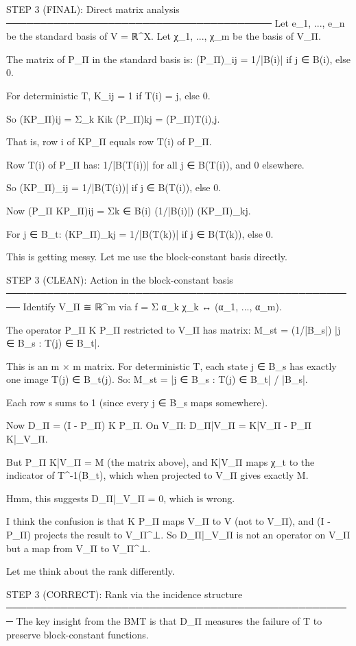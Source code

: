 STEP 3 (FINAL): Direct matrix analysis
───────────────────────────────────────
Let {e_1, ..., e_n} be the standard basis of V = ℝ^X.
Let {χ_1, ..., χ_m} be the basis of V_Π.

The matrix of P_Π in the standard basis is:
(P_Π)_{ij} = 1/|B(i)| if j ∈ B(i), else 0.

For deterministic T, K_{ij} = 1 if T(i) = j, else 0.

So (KP_Π){ij} = Σ_k K{ik} (P_Π){kj} = (P_Π){T(i),j}.

That is, row i of KP_Π equals row T(i) of P_Π.

Row T(i) of P_Π has: 1/|B(T(i))| for all j ∈ B(T(i)), and 0 elsewhere.

So (KP_Π)_{ij} = 1/|B(T(i))| if j ∈ B(T(i)), else 0.

Now (P_Π KP_Π){ij} = Σ{k ∈ B(i)} (1/|B(i)|) (KP_Π)_{kj}.

For j ∈ B_t:
(KP_Π)_{kj} = 1/|B(T(k))| if j ∈ B(T(k)), else 0.

This is getting messy. Let me use the block-constant basis directly.

STEP 3 (CLEAN): Action in the block-constant basis
────────────────────────────────────────────────────
Identify V_Π ≅ ℝ^m via f = Σ α_k χ_k ↔ (α_1, ..., α_m).

The operator P_Π K P_Π restricted to V_Π has matrix:
M_{st} = (1/|B_s|) |{j ∈ B_s : T(j) ∈ B_t}|.

This is an m × m matrix. For deterministic T, each state j ∈ B_s has exactly
one image T(j) ∈ B_{t(j)}. So:
M_{st} = |{j ∈ B_s : T(j) ∈ B_t}| / |B_s|.

Each row s sums to 1 (since every j ∈ B_s maps somewhere).

Now D_Π = (I - P_Π) K P_Π. On V_Π:
D_Π|{V_Π} = K|{V_Π} - P_Π K|_{V_Π}.

But P_Π K|{V_Π} = M (the matrix above), and K|{V_Π} maps χ_t to the
indicator of T^{-1}(B_t), which when projected to V_Π gives exactly M.

Hmm, this suggests D_Π|_{V_Π} = 0, which is wrong.

I think the confusion is that K P_Π maps V_Π to V (not to V_Π), and
(I - P_Π) projects the result to V_Π^⊥. So D_Π|_{V_Π} is not an operator
on V_Π but a map from V_Π to V_Π^⊥.

Let me think about the rank differently.

STEP 3 (CORRECT): Rank via the incidence structure
───────────────────────────────────────────────────
The key insight from the BMT is that D_Π measures the failure of T to
preserve block-constant functions.

